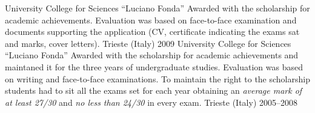 
\begin{cvhonors}

  \cvhonor
{University College for Sciences ``Luciano Fonda''}
{
   Awarded with the scholarship for academic achievements.
   Evaluation was based on face-to-face examination and documents supporting the
   application (CV, certificate indicating the
   exams sat and marks, cover letters).}
{Trieste (Italy)}
{2009}
  \cvhonor
{University College for Sciences ``Luciano Fonda''}
{
   Awarded with the scholarship for academic achievements and
   maintaned it
   for the three years of undergraduate studies.
   Evaluation was based on writing and face-to-face
   examinations.
   To maintain the right to the scholarship students had to sit all
   the exams set for each year obtaining 
   an \emph{average mark of at least 27/30} 
   and \emph{no less than 24/30} in every exam.}
{Trieste (Italy)}
{2005--2008}
\end{cvhonors}











